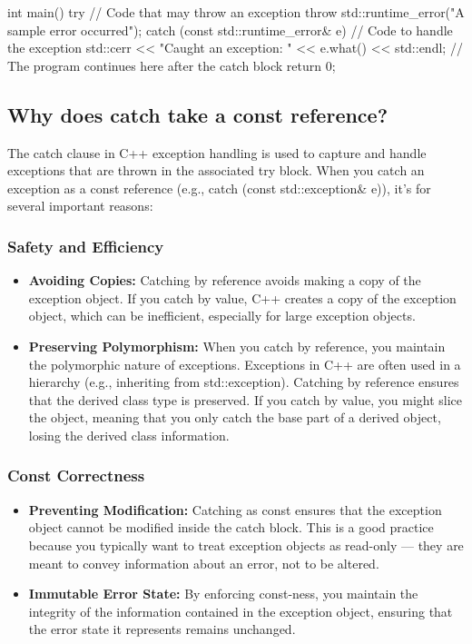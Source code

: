 \documentclass{report}
\begin{document}
\begin{concept}
\begin{cppcode}
        int main() {
            try {
                // Code that may throw an exception
                throw std::runtime_error("A sample error occurred");
            } catch (const std::runtime_error& e) {
                // Code to handle the exception
                std::cerr << "Caught an exception: " << e.what() << std::endl;
            }
            // The program continues here after the catch block
            return 0;
        }

    \end{cppcode}

    \bigbreak \noindent 
    \subsection{Why does catch take a const reference?}
    \bigbreak \noindent 
    The catch clause in C++ exception handling is used to capture and handle exceptions that are thrown in the associated try block. When you catch an exception as a const reference (e.g., catch (const std::exception\& e)), it's for several important reasons:
    \bigbreak \noindent 
    \subsubsection{Safety and Efficiency}
    \begin{itemize}
        \item \textbf{Avoiding Copies:} Catching by reference avoids making a copy of the exception object. If you catch by value, C++ creates a copy of the exception object, which can be inefficient, especially for large exception objects.
        \item \textbf{Preserving Polymorphism:} When you catch by reference, you maintain the polymorphic nature of exceptions. Exceptions in C++ are often used in a hierarchy (e.g., inheriting from std::exception). Catching by reference ensures that the derived class type is preserved. If you catch by value, you might slice the object, meaning that you only catch the base part of a derived object, losing the derived class information.
    \end{itemize}

    \bigbreak \noindent 
    \subsubsection{Const Correctness}
    \bigbreak \noindent 
    \begin{itemize}
        \item \textbf{Preventing Modification:} Catching as const ensures that the exception object cannot be modified inside the catch block. This is a good practice because you typically want to treat exception objects as read-only — they are meant to convey information about an error, not to be altered.
        \item \textbf{Immutable Error State:} By enforcing const-ness, you maintain the integrity of the information contained in the exception object, ensuring that the error state it represents remains unchanged.
    \end{itemize}


\end{concept}
\end{document}
